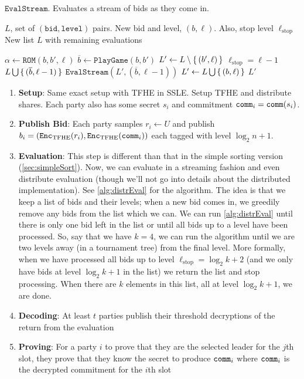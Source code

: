 \documentclass[11pt]{article}
\begin{document}
\begin{algorithm}
	\caption{$\texttt{EvalStream}$. Evaluates a stream of bids as they come in.}
	\label{alg:distrEval}
	\begin{algorithmic}
		\Require $L$, set of $(\texttt{bid}, \texttt{level})$ pairs. New bid and level, $(b, \ell)$. Also, stop level $\ell_{\mathrm{stop}}$
		\Ensure New list $L$ with remaining evaluations
		
		\State $\alpha \gets \texttt{ROM}(b, b', \ell)$
		\State $\overline{b} \gets \texttt{PlayGame}(b, b')$
		\State $L' \gets L \setminus \set{(b', \ell)}$
		\If $\ell_{\mathrm{stop}} = \ell - 1$
		\State \Return $L \bigcup \set{(\overline{b}, \ell - 1)}$
		\Else
		\State \Return $\texttt{EvalStream}(L', (\overline{b}, \ell - 1))$
		\EndIf
		\Else
		\State $L' \gets L \bigcup \set{(b, \ell)}$
		\State \Return $L'$
		\EndIf
	\end{algorithmic}
\end{algorithm}

\begin{enumerate}
	\item \textbf{Setup}: Same exact setup with TFHE in SSLE. Setup TFHE and distribute shares.
	      Each party also has some secret $s_i$ and commitment $\texttt{comm}_i = \texttt{comm}(s_i)$.
	\item \textbf{Publish Bid}: Each party samples $r_i \leftarrow U$ and publish $b_i = (\texttt{Enc}_{\mathrm{TFHE}}(r_i), \texttt{Enc}_{\mathrm{TFHE}}(\texttt{comm}_i))$ each tagged with level $\log_2 n + 1$.
	\item \textbf{Evaluation}: This step is different than that in the simple sorting version (\cref{sec:simpleSort}).
	      Now, we can evaluate in a streaming fashion and even distribute evaluation (though we'll not go into details about the distributed implementation).
	      See \cref{alg:distrEval} for the algorithm. The idea is that we keep a list of bids and their levels;
	      when a new bid comes in, we greedily remove any bids from the list which we can. We can run \cref{alg:distrEval}
	      until there is only one bid left in the list or until all bids up to a level have been processed.
	      So, say that we have $k = 4$, we can run the algorithm until we are two levels away (in a tournament tree) from the final level.
	      More formally, when we have processed all bids up to level $\ell_{\mathrm{stop}} = \log_2 k + 2$ (and we only have bids at level $\log_2 k + 1$ in the list) we return the list and stop processing.
	      When there are $k$ elements in this list, all at level $\log_2 k + 1$, we are done.

	      
	\item \textbf{Decoding}: At least $t$ parties publish their threshold decryptions of the return from the evaluation
	\item \textbf{Proving}: For a party $i$ to prove that they are the selected leader for the $j$th slot, they prove that they know the secret to produce $\texttt{comm}_i$
	      where $\texttt{comm}_i$ is the decrypted commitment for the $i$th slot
\end{enumerate}



\end{document}
